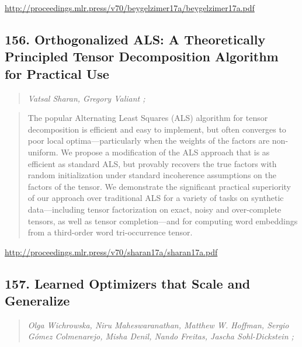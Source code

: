 \documentclass{article}
\begin{document}
\href{http://proceedings.mlr.press/v70/beygelzimer17a/beygelzimer17a.pdf}{http://proceedings.mlr.press/v70/beygelzimer17a/beygelzimer17a.pdf}

\subsection{156. Orthogonalized ALS: A Theoretically Principled Tensor Decomposition Algorithm for Practical Use}

\begin{quote}
\footnotesize{\textit{Vatsal Sharan, Gregory Valiant ;}}
\end{quote}

\begin{quote}
    The popular Alternating Least Squares (ALS) algorithm for tensor decomposition is efficient and easy to implement, but often converges to poor local optima—particularly when the weights of the factors are non-uniform. We propose a modification of the ALS approach that is as efficient as standard ALS, but provably recovers the true factors with random initialization under standard incoherence assumptions on the factors of the tensor. We demonstrate the significant practical superiority of our approach over traditional ALS for a variety of tasks on synthetic data—including tensor factorization on exact, noisy and over-complete tensors, as well as tensor completion—and for computing word embeddings from a third-order word tri-occurrence tensor.  \end{quote}

\href{http://proceedings.mlr.press/v70/sharan17a/sharan17a.pdf}{http://proceedings.mlr.press/v70/sharan17a/sharan17a.pdf}

\subsection{157. Learned Optimizers that Scale and Generalize}

\begin{quote}
\footnotesize{\textit{Olga Wichrowska, Niru Maheswaranathan, Matthew W. Hoffman, Sergio Gómez Colmenarejo, Misha Denil, Nando Freitas, Jascha Sohl-Dickstein ;}}
\end{quote}
\end{document}
